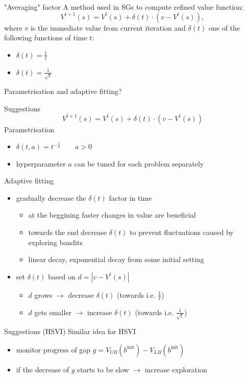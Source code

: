 \documentclass{beamer}
\begin{document}
\begin{frame}{"Averaging" factor}
    A method used in SGs to compute refined value function:
    \begin{equation*}
        V^{t+1}(s) = V^{t}(s) + \delta(t) \cdot (v - V^{t}(s)),
    \end{equation*}
    where $v$ is the immediate value from current iteration and $\delta(t)$ one of the following functions of time $t$:
    \begin{itemize}
        \item $\delta(t) = \frac{1}{t}$ 
        \item $\delta(t) = \frac{1}{\sqrt{t}}$ 
    \end{itemize}

    Parametrisation and adaptive fitting?
\end{frame}

\begin{frame}{Suggestions}
    \begin{equation*}
        V^{t+1}(s) = V^{t}(s) + \delta(t) \cdot (v - V^{t}(s))
    \end{equation*}
    Parametrisation
    \begin{itemize}
        \item $\delta(t, a) = t^{-\frac{1}{a}} \qquad a > 0$
        \item hyperparameter $a$ can be tuned for each problem separately
    \end{itemize}
    Adaptive fitting
    \begin{itemize}
        \item gradually decrease the $\delta(t)$ factor in time
        \begin{itemize}
            \item at the beggining faster changes in value are beneficial
            \item towards the end decrease $\delta(t)$ to prevent fluctuations caused by exploring bandits
            \item linear decay, exponential decay from some initial setting
        \end{itemize}
        \item set $\delta(t)$ based on $d = |v - V^t(s)|$
        \begin{itemize}
            \item $d$ grows $\rightarrow$ decrease $\delta(t)$ (towards i.e. $\frac{1}{t}$)
            \item $d$ gets smaller $\rightarrow$ increase $\delta(t)$ (towards i.e. $\frac{1}{\sqrt{t}}$)
        \end{itemize}
    \end{itemize}
\end{frame}

\begin{frame}{Suggestions (HSVI)}
    Similar idea for HSVI
    \begin{itemize}
        \item monitor progress of gap $g = V_{UB}(b^{\text{init}}) - V_{LB}(b^{\text{init}})$
        \item if the decrease of $g$ starts to be slow $\rightarrow$ increase exploration
    \end{itemize}
\end{frame}
\end{document}
